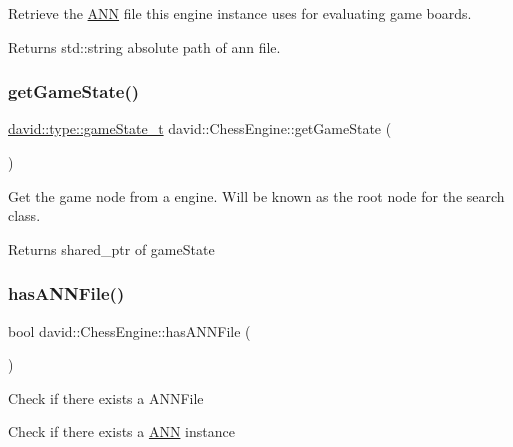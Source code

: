 Retrieve the \hyperlink{classdavid_1_1ANN}{A\+NN} file this engine instance uses for evaluating game boards. \begin{DoxyReturn}{Returns}
std\+::string absolute path of ann file. 
\end{DoxyReturn}
\mbox{\label{classdavid_1_1ChessEngine_aad2aa712b003d233c682463de9930fd2}} 
\subsubsection{\texorpdfstring{get\+Game\+State()}{getGameState()}}
{\footnotesize\ttfamily \hyperlink{structdavid_1_1bitboard_1_1gameState}{david\+::type\+::game\+State\+\_\+t} david\+::\+Chess\+Engine\+::get\+Game\+State (\begin{DoxyParamCaption}{ }\end{DoxyParamCaption})}

Get the game node from a engine. Will be known as the root node for the search class.

\begin{DoxyReturn}{Returns}
shared\+\_\+ptr of game\+State 
\end{DoxyReturn}
\mbox{\label{classdavid_1_1ChessEngine_a311f1a02d29e394759d20ca656c79ad2}} 
\subsubsection{\texorpdfstring{has\+A\+N\+N\+File()}{hasANNFile()}}
{\footnotesize\ttfamily bool david\+::\+Chess\+Engine\+::has\+A\+N\+N\+File (\begin{DoxyParamCaption}{ }\end{DoxyParamCaption})}

Check if there exists a A\+N\+N\+File

Check if there exists a \hyperlink{classdavid_1_1ANN}{A\+NN} instance \mbox{\label{classdavid_1_1ChessEngine_a613d9156ef352542a940f544779036ad}} 
